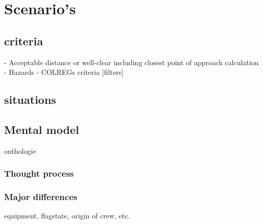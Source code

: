 \chapter{Scenario's}

\section{criteria}
- Acceptable distance or well-clear including closest point of approach calculation
- Hazards
- COLREGs criteria [filters]

\section{situations}


\section{Mental model}
onthologie

\subsection{Thought process}

\subsection{Major differences}
equipment, flagstate, origin of crew, etc.
